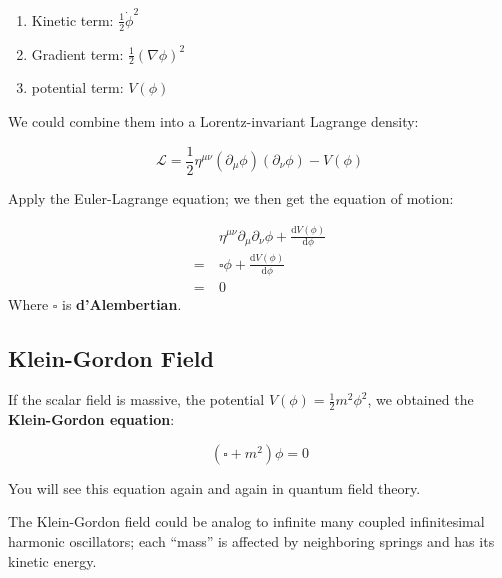 \documentclass[12pt]{article}
\numberwithin{equation}{subsection}
\theoremstyle{mystyle}{\newtheorem{definition}{Definition}[subsection]}
\theoremstyle{mystyle}{\newtheorem{theorem}[definition]{Theorem}}
\theoremstyle{mystyle}{\newtheorem*{remark}{Remark}}
\theoremstyle{mystyle}{\newtheorem{example}{Example}[subsection]}
\theoremstyle{mystyle}{\newtheorem{examples}{Examples}[subsection]}
\theoremstyle{mystyle}{\newtheorem{cthm}{}[subsection]}
\newcommand{\p}{\partial}
\begin{document}
\begin{enumerate}
  \item Kinetic term: \(\frac{1}{2}\dot{\phi}^2\)
  \item Gradient term: \(\frac{1}{2}(\nabla\phi)^2\)
  \item potential term: \(V(\phi)\)
\end{enumerate}
We could combine them into a Lorentz-invariant Lagrange density:
\begin{cthm}
  \[\mathcal{L}= \frac{1}{2}\eta^{\mu\nu}(\p_{\mu}\phi)(\p_{\nu}\phi)-V(\phi)\]
\end{cthm}
Apply the Euler-Lagrange equation; we then get the equation of motion:
\begin{cthm}
  \begin{align*}            & \eta^{\mu\nu}\p_{\mu}\p_{\nu}\phi+\frac{\mathrm{d}V(\phi)}{\mathrm{d}\phi} \\
                      =\  & \square\phi+\frac{\mathrm{d}V(\phi)}{\mathrm{d}\phi}                       \\
                      =\  & 0
  \end{align*}
  Where \(\square\) is \textbf{d'Alembertian}.
\end{cthm}
\subsection{Klein-Gordon Field}
If the scalar field is massive, the potential \(V(\phi)=\frac{1}{2}m^2\phi^2\),
we obtained the \textbf{Klein-Gordon equation}:
\begin{cthm}
  \[(\square +m^2)\phi = 0\]
\end{cthm}
You will see this equation again and again in quantum field theory.
\begin{remark}
  The Klein-Gordon field could be analog to infinite many coupled infinitesimal harmonic oscillators;
  each ``mass'' is affected by neighboring springs and has its kinetic energy.
\end{remark}
\end{document}
